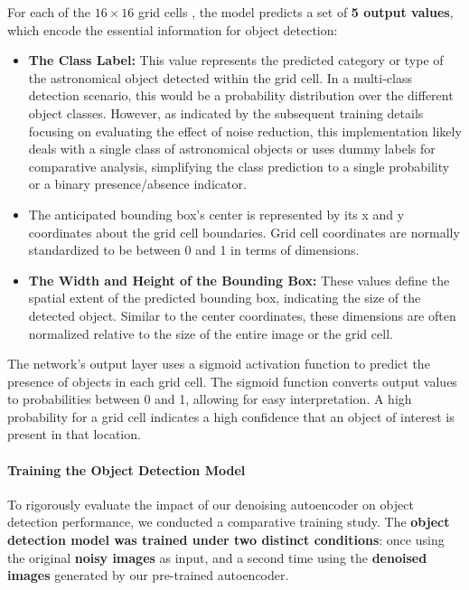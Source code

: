 \documentclass[12pt, conference]{IEEEtran}
\begin{document}
For each of the $16 \times 16$ grid cells \cite{redmon2016you}, the model predicts a set of \textbf{5 output values}, which encode the essential information for object detection:

\begin{itemize}
    \item \textbf{The Class Label:} This value represents the predicted category or type of the astronomical object detected within the grid cell. In a multi-class detection scenario, this would be a probability distribution over the different object classes. However, as indicated by the subsequent training details focusing on evaluating the effect of noise reduction, this implementation likely deals with a single class of astronomical objects or uses dummy labels for comparative analysis, simplifying the class prediction to a single probability or a binary presence/absence indicator.
    \item The anticipated bounding box's center is represented by its x and y coordinates about the grid cell boundaries. Grid cell coordinates are normally standardized to be between 0 and 1 in terms of dimensions.
    \item \textbf{The Width and Height of the Bounding Box:} These values define the spatial extent of the predicted bounding box, indicating the size of the detected object. Similar to the center coordinates, these dimensions are often normalized relative to the size of the entire image or the grid cell.
\end{itemize}
The network's output layer uses a sigmoid activation function to predict the presence of objects in each grid cell. The sigmoid function converts output values to probabilities between 0 and 1, allowing for easy interpretation. A high probability for a grid cell indicates a high confidence that an object of interest is present in that location.

 
\paragraph{Training the Object Detection Model}

To rigorously evaluate the impact of our denoising autoencoder on object detection performance, we conducted a comparative training study. The \textbf{object detection model was trained under two distinct conditions}: once using the original \textbf{noisy images} as input, and a second time using the \textbf{denoised images} generated by our pre-trained autoencoder.
\end{document}
